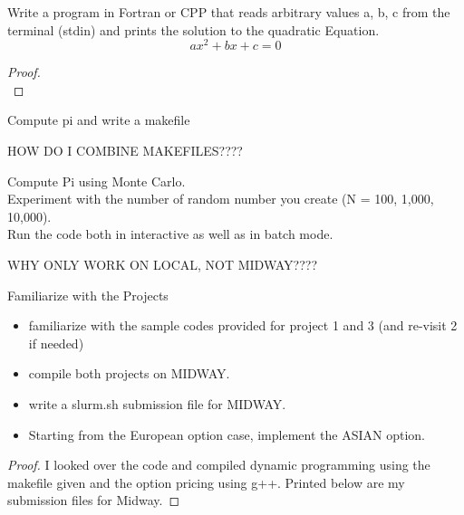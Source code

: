 \documentclass[12pt]{article}
\newenvironment{problem}[2][Problem]{\begin{trivlist}
\item[\hskip \labelsep {\bfseries #1}\hskip \labelsep {\bfseries #2.}]}{\end{trivlist}}
\begin{document}
\newpage
\begin{problem}{3}
Write a program in Fortran or CPP that reads arbitrary values a, b, c from the terminal (stdin) and prints the solution to the quadratic Equation.\\
$$ax^2 + bx + c=0$$
\end{problem}
\begin{proof}~\\

\end{proof}
\newpage
\begin{problem}{4}
Compute pi and write a makefile
\end{problem}


{\huge HOW DO I COMBINE MAKEFILES????}


\begin{problem}{5}
Compute Pi using Monte Carlo. \\
Experiment with the number of random number you create (N = 100, 1,000, 10,000).\\
Run the code both in interactive as well as in batch mode.
\end{problem}

{\huge WHY ONLY WORK ON LOCAL, NOT MIDWAY????}


\newpage
\begin{problem}{6}Familiarize with the Projects
\begin{itemize}
\item familiarize with the sample codes provided for project 1 and 3 (and re-visit 2 if needed)
\item compile both projects on MIDWAY.
\item write a slurm.sh submission file for MIDWAY.
\item Starting from the European option case, implement the ASIAN option.
\end{itemize}
\end{problem}
\begin{proof}
I looked over the code and compiled dynamic programming using the makefile given and the option pricing using g++. Printed below are my submission files for Midway.



\end{proof}
\end{document}
